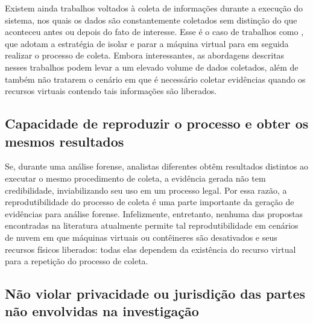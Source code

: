 \documentclass[conference]{IEEEtran}
\begin{document}
Existem ainda trabalhos voltados à coleta de informações durante a execução do sistema, nos quais os dados são constantemente coletados sem distinção do que aconteceu antes ou depois do fato de interesse.
%
Esse é o caso de trabalhos como \cite{Poisel_VMI:2013,Dykstra_FROST:2013,Sang_Log_approach:2013}, que adotam a estratégia de isolar e parar a máquina virtual para em seguida realizar o processo de coleta. 
%
Embora interessantes, as abordagens descritas nesses trabalhos podem levar a um elevado volume de dados coletados, além de também não tratarem o cenário em que é necessário coletar evidências quando os recursos virtuais contendo tais informações são liberados.


\subsection{Capacidade de reproduzir o processo e obter os mesmos resultados}

Se, durante uma análise forense, analistas diferentes obtêm resultados distintos ao executar o mesmo procedimento de coleta, a evidência gerada não tem credibilidade, inviabilizando seu uso em um processo legal. 
%
Por essa razão, a reprodutibilidade do processo de coleta é uma parte importante da geração de evidências para análise forense.
%
Infelizmente, entretanto, nenhuma das propostas encontradas na literatura atualmente permite tal reprodutibilidade em cenários de nuvem em que máquinas virtuais ou contêineres são desativados e seus recursos físicos liberados: todas elas dependem da existência do recurso virtual para a repetição do processo de coleta.

\subsection{Não violar privacidade ou jurisdição das partes não envolvidas na investigação}
\end{document}
